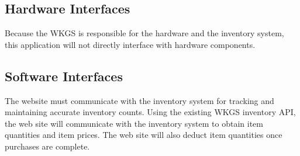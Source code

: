 \documentclass{scrreprt}
\theoremstyle{funreq}
\begin{document}

\subsection{Hardware Interfaces}
Because the WKGS is responsible for the hardware and the inventory system, this application will not directly interface with hardware components. 

\subsection{Software Interfaces}
The website must communicate with the inventory system for tracking and maintaining accurate inventory counts.  Using the existing WKGS inventory API, the web site will communicate with the inventory system to obtain item quantities and item prices.  The web site will also deduct item quantities once purchases are complete. 


\end{document}
